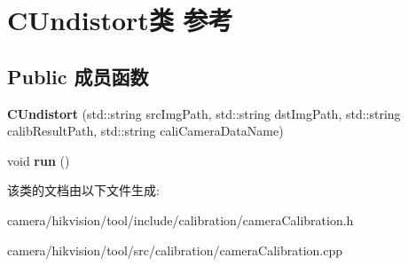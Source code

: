 \hypertarget{class_c_undistort}{}\section{C\+Undistort类 参考}
\label{class_c_undistort}
\subsection*{Public 成员函数}
\begin{DoxyCompactItemize}
\item 
\mbox{\label{class_c_undistort_ab14f88b2958c2ce00d738672dbb4df40}} 
{\bfseries C\+Undistort} (std\+::string src\+Img\+Path, std\+::string dst\+Img\+Path, std\+::string calib\+Result\+Path, std\+::string cali\+Camera\+Data\+Name)
\item 
\mbox{\label{class_c_undistort_aa024a011cc99d203015eea067b8ca642}} 
void {\bfseries run} ()
\end{DoxyCompactItemize}


该类的文档由以下文件生成\+:\begin{DoxyCompactItemize}
\item 
camera/hikvision/tool/include/calibration/camera\+Calibration.\+h\item 
camera/hikvision/tool/src/calibration/camera\+Calibration.\+cpp\end{DoxyCompactItemize}
